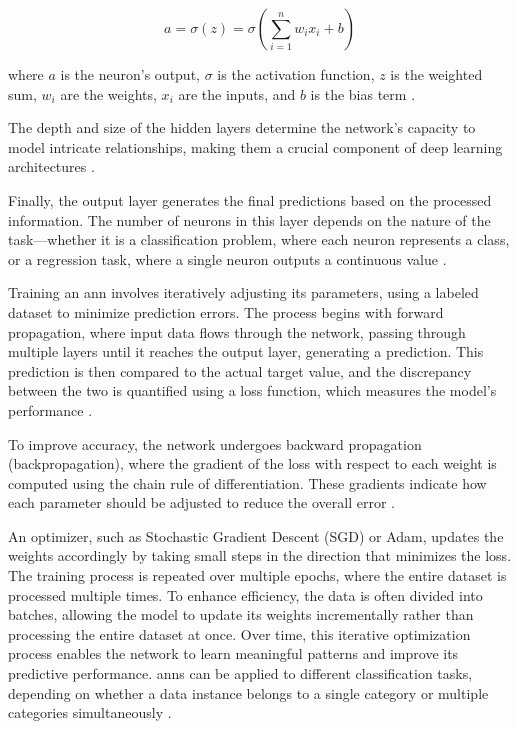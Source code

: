 \begin{equation}
  a = \sigma(z) = \sigma\left(\sum_{i=1}^{n} w_i x_i + b\right)
\end{equation}

where \(a\) is the neuron’s output, \(\sigma\) is the activation function, \(z\) is the weighted sum, \(w_i\) are the weights, \(x_i\) are the inputs, and \(b\) is the bias term \cite{neuronimage}.

The depth and size of the hidden layers determine the network's capacity to model intricate relationships, making them a crucial component of deep learning architectures \cite{dongare2012introduction}.

Finally, the output layer generates the final predictions based on the processed information.
The number of neurons in this layer depends on the nature of the task—whether it is a classification problem, where each neuron represents a class, or a regression task, where a single neuron outputs a continuous value \cite{dongare2012introduction}.

Training an \ac{ann} involves iteratively adjusting its parameters, using a labeled dataset to minimize prediction errors.
The process begins with forward propagation, where input data flows through the network, passing through multiple layers until it reaches the output layer, generating a prediction.
This prediction is then compared to the actual target value, and the discrepancy between the two is quantified using a loss function, which measures the model's performance \cite{russell2016artificial}.

To improve accuracy, the network undergoes backward propagation (backpropagation), where the gradient of the loss with respect to each weight is computed using the chain rule of differentiation.
These gradients indicate how each parameter should be adjusted to reduce the overall error \cite{russell2016artificial}.

An optimizer, such as Stochastic Gradient Descent (SGD) or Adam, updates the weights accordingly by taking small steps in the direction that minimizes the loss.
The training process is repeated over multiple epochs, where the entire dataset is processed multiple times.
To enhance efficiency, the data is often divided into batches, allowing the model to update its weights incrementally rather than processing the entire dataset at once.
Over time, this iterative optimization process enables the network to learn meaningful patterns and improve its predictive performance.
\ac{ann}s can be applied to different classification tasks, depending on whether a data instance belongs to a single category or multiple categories simultaneously \cite{russell2016artificial}.

